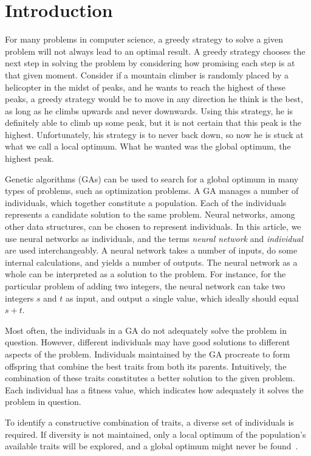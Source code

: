 \section{Introduction}
For many problems in computer science, a greedy strategy to solve a given problem will not always lead to an optimal result. A greedy strategy chooses the next step in solving the problem by considering how promising each step is at that given moment. Consider if a mountain climber is randomly placed by a helicopter in the midst of peaks, and he wants to reach the highest of these peaks, a greedy strategy would be to move in any direction he think is the best, as long as he climbs upwards and never downwards. Using this strategy, he is definitely able to climb up some peak, but it is not certain that this peak is the highest. Unfortunately, his strategy is to never back down, so now he is stuck at what we call a local optimum. What he wanted was the global optimum, the highest peak.
 
Genetic algorithms (GAs) can be used to search for a global optimum in many types of problems, such as optimization problems. A GA manages a number of individuals, which together constitute a population. Each of the individuals represents a candidate solution to the same problem. Neural networks, among other data structures, can be chosen to represent individuals. In this article, we use neural networks as individuals, and the terms \emph{neural network} and \emph{individual} are used interchangeably. A neural network takes a number of inputs, do some internal calculations, and yields a number of outputs. The neural network as a whole can be interpreted as a solution to the problem. For instance, for the particular problem of adding two integers, the neural network can take two integers $s$ and $t$ as input, and output a single value, which ideally should equal $s + t$.

Most often, the individuals in a GA do not adequately solve the problem in question.
However, different individuals may have good solutions to different aspects of the problem.
Individuals maintained by the GA procreate to form offspring that combine the best traits from both its parents. Intuitively, the combination of these traits constitutes a better solution to the given problem. Each individual has a fitness value, which indicates how adequately it solves the problem in question.

To identify a constructive combination of traits, a diverse set of individuals is required. If diversity is not maintained, only a local optimum of the population's available traits will be explored, and a global optimum might never be found~\cite{ursem2002diversity,Darwen00doesextra}.

